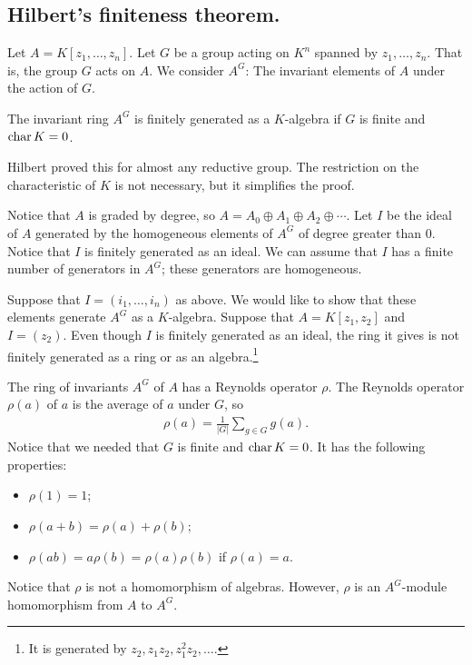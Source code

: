 \documentclass [11 pt, oneside] {article}
\begin{document}
\subsection{Hilbert's finiteness theorem.}
Let $A = K[z_1,\hdots, z_n]$. Let $G$ be a group acting on $K^n$ spanned by $z_1,\hdots, z_n$. That is, the group $G$ acts on $A$. We consider $A^G$: The invariant elements of $A$ under the action of $G$.

\begin{theorem}[Hilbert]\label{}
The invariant ring $A^G$ is finitely generated as a $K$-algebra if $G$ is finite and $\operatorname{char} K = 0$.
\end{theorem}
\begin{remark}
	Hilbert proved this for almost any reductive group. The restriction on the characteristic of $K$ is not necessary, but it simplifies the proof.
\end{remark}

Notice that $A$ is graded by degree, so $A = A_0\oplus A_1\oplus A_2\oplus \cdots$. Let $I$ be the ideal of $A$ generated by the homogeneous elements of $A^G$ of degree greater than $0$. Notice that $I$ is finitely generated as an ideal. We can assume that $I$ has a finite number of generators in $A^G$; these generators are homogeneous. 

Suppose that $I=(i_1,\hdots,i_n)$ as above. We would like to show that these elements generate $A^G$ as a $K$-algebra. Suppose that $A=K[z_1,z_2]$ and $I = (z_2)$. Even though $I$ is finitely generated as an ideal, the ring it gives is not finitely generated as a ring or as an algebra.\footnote{It is generated by $z_2,z_1z_2, z_1^2z_2,\hdots$.} 

The ring of invariants $A^G$ of $A$ has a Reynolds operator $\rho$. The Reynolds operator $\rho(a)$ of $a$ is the average of $a$ under $G$, so
\begin{align*}
	\rho(a) = \frac{1}{\left\lvert G \right\rvert } \sum_{g\in G}^{} g(a).
\end{align*}
Notice that we needed that $G$ is finite and $\operatorname{char} K = 0$. It has the following properties:
\begin{itemize}
	\item $\rho(1)=1$;
	\item $\rho(a+b) = \rho (a)+\rho (b)$;
	\item $\rho(ab) = a\rho (b)=\rho(a)\rho (b)$ if $\rho(a)=a$.
\end{itemize}
Notice that $\rho$ is not a homomorphism of algebras. However, $\rho$ is an $A^G$-module homomorphism from $A$ to $A^G$.
\end{document}
